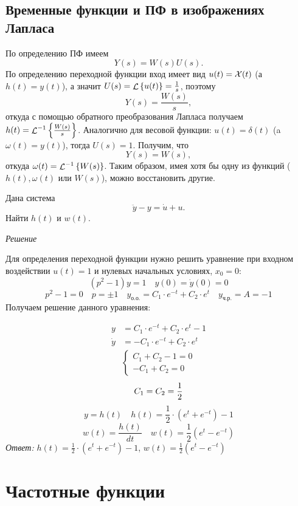 \documentclass[../../TAU.tex]{subfiles}
\begin{document}
\subsection{Временные функции и ПФ в изображениях Лапласа }

    По определению ПФ имеем
    $$
        Y(s) = W(s)U(s).
    $$
    По определению переходной функции вход имеет вид 
    $u(t) = \mathcal{X}(t)$ 
    (а~$h(t) = y(t)$), а значит 
    $U(s) = \mathop{\mathcal{L}}\nolimits\left\{u(t)\right\} = \frac{1}{s}$, поэтому
    $$
        Y(s) = \frac{W(s)}{s},
    $$
    откуда с помощью обратного преобразования Лапласа получаем 
    $h(t) = {\mathop{\mathcal{L}}\nolimits^{-1}\left\{\frac{W(s)}{s}\right\}}$.
    Аналогично для весовой функции: 
    $u(t) = \delta(t)$ 
    (a $\omega(t) = y(t)$), тогда $U(s)=1$. Получим, что
    $$
        Y(s) = W(s),
    $$
    откуда 
    $\omega(t) = {\mathop{\mathcal{L}}\nolimits^{-1}\left\{W(s)\right\}}$.
    Таким образом, имея хотя бы одну из функций ($h(t), \omega(t)$ или $W(s)$), можно восстановить другие.

    \examp Дана система
    $$
        \ddot y - y = \dot u + u.
    $$
    Найти $h(t)$ и $w(t)$.

    \textit{Решение}

    Для определения переходной функции нужно решить уравнение при входном воздействии $u(t)=1$ и нулевых начальных условиях, $x_0 = 0$:
    $$
        (p^2-1)y=1\quad y(0)=\dot y(0)=0
    $$
    $$
        p^2-1=0\quad p=\pm1\quad y_\text{о.о.}=C_1\cdot e^{-t}+C_2\cdot e^t\quad y_\text{ч.р.}=A=-1
    $$
    Получаем решение данного уравнения:

    \begin{align*}
        y &= C_1\cdot e^{-t}+C_2\cdot e^t-1     \\
        \dot y &= -C_1\cdot e^{-t}+C_2\cdot e^t
    \end{align*}
    \begin{align*}
        \begin{cases}
          C_1+C_2-1 = 0\\
         -C_1+C_2   = 0
        \end{cases}
    \end{align*}
    \[
        C_1=C_2={1\over2}
    \]
    \[
        y=h(t) \quad h(t)=\frac{1}{2}\cdot(e^t+e^{-t})-1
    \]
    \[
        w(t)=\frac{h(t)}{dt} \quad w(t)=\frac{1}{2}(e^t-e^{-t})
    \]
    \textit{Ответ:}
    $h(t)=\frac{1}{2}\cdot(e^t+e^{-t})-1$, $w(t)=\frac{1}{2}(e^t-e^{-t})$

\section{Частотные функции}
\end{document}
